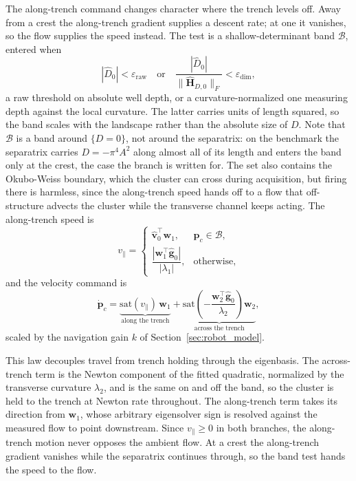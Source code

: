 \documentclass[lettersize,journal]{IEEEtran}
\begin{document}
The along-trench command changes character where the trench levels off.
Away from a crest the along-trench gradient supplies a descent rate; at
one it vanishes, so the flow supplies the speed instead. The test is a shallow-determinant band $\mathcal{B}$, entered when
\begin{equation}
    |\hat{D}_0| < \varepsilon_{\mathrm{raw}}
    \quad\text{or}\quad
    \frac{|\hat{D}_0|}{\|\hat{\mathbf{H}}_{D,0}\|_F}
        < \varepsilon_{\dim},
\end{equation}
a raw threshold on absolute well depth, or a curvature-normalized one measuring depth against the local curvature. The latter carries units of length squared, so the band scales with the landscape rather than the absolute size of $D$. Note that $\mathcal{B}$ is a band around
$\{D = 0\}$, not around the separatrix: on the benchmark the separatrix
carries $D = -\pi^4 A^2$ along almost all of its length and enters the
band only at the crest, the case the branch is written for. The set
also contains the Okubo-Weiss boundary, which the cluster can cross
during acquisition, but firing there is harmless, since the
along-trench speed hands off to a flow that off-structure advects the
cluster while the transverse channel keeps acting. The
along-trench speed is
\begin{equation}
    v_\parallel =
    \begin{cases}
        \hat{\mathbf{v}}_0^\top \mathbf{w}_1,
            & \mathbf{p}_c \in \mathcal{B}, \\[6pt]
        \dfrac{|\mathbf{w}_1^\top \hat{\mathbf{g}}_0|}{|\lambda_1|},
            & \text{otherwise},
    \end{cases}
    \label{eq:vpar}
\end{equation}
and the velocity command is
\begin{equation}
    \dot{\mathbf{p}}_c =
    \underbrace{\mathrm{sat}(v_\parallel)\,\mathbf{w}_1}_{\text{along the trench}}
    + \underbrace{\mathrm{sat}\!\left(-\frac{\mathbf{w}_2^\top
      \hat{\mathbf{g}}_0}{\lambda_2}\right)\mathbf{w}_2}_{\text{across the trench}},
    \label{eq:d_law}
\end{equation}
scaled by the navigation gain $k$ of Section~\ref{sec:robot_model}.

This law decouples travel from trench holding through the eigenbasis.
The across-trench term is the Newton component of the fitted quadratic,
normalized by the transverse curvature $\lambda_2$, and is the same
on and off the band, so the cluster is held to the trench at Newton rate
throughout. The along-trench term takes its direction from $\mathbf{w}_1$, whose
arbitrary eigensolver sign is resolved against the measured flow to
point downstream. Since
$v_\parallel \geq 0$ in both branches, the
along-trench motion never opposes the ambient flow. At a crest the along-trench gradient vanishes while the separatrix
continues through, so the band test hands the speed to the flow.
\end{document}
